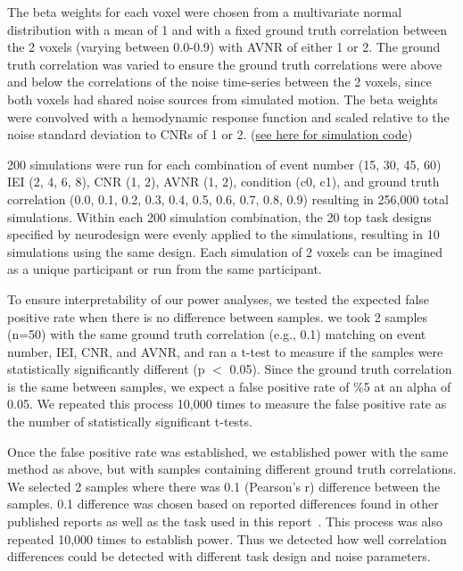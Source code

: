 \documentclass[10pt,letterpaper]{article}
\begin{document}
The beta weights for each voxel were chosen from a multivariate normal distribution
with a mean of 1 and with a fixed ground truth correlation between the 2 voxels 
(varying between 0.0-0.9) with AVNR of either 1 or 2.
The ground truth correlation was varied to ensure the ground truth correlations were above
and below the correlations of the noise time-series between the 2 voxels,
since both voxels had shared noise sources from simulated motion.
The beta weights were convolved with a hemodynamic response function and scaled
relative to the noise standard deviation to CNRs of 1 or 2.
(\href{https://github.com/jdkent/betaSeriesSimulations/tree/38dfbf2d83a8ab742d134c490b850ad893c8b4c7/beta_sim}{see here for simulation code})

200 simulations were run for each combination of event number
(15, 30, 45, 60) IEI (2, 4, 6, 8),  CNR (1, 2), AVNR (1, 2), condition (c0, c1),
and ground truth correlation
(0.0, 0.1, 0.2, 0.3, 0.4, 0.5, 0.6, 0.7, 0.8, 0.9)
resulting in 256,000 total simulations.
Within each 200 simulation combination, the 20 top task designs specified by
neurodesign were evenly applied to the simulations, resulting in 10 simulations
using the same design.
Each simulation of 2 voxels can be imagined as a unique participant or run from
the same participant.

To ensure interpretability of our power analyses, we tested
the expected false positive rate when there is no difference between samples.
we took 2 samples (n=50) with the same ground truth correlation (e.g., 0.1)
matching on event number, IEI, CNR, and AVNR, and ran a t-test to measure if the samples
were statistically significantly different (p $<$ 0.05).
Since the ground truth correlation is the same between samples,
we expect a false positive rate of \%5 at an alpha of 0.05.
We repeated this process 10,000 times to measure the false positive rate as
the number of statistically significant t-tests.

Once the false positive rate was established, we established power with the same method as above,
but with samples containing different ground truth correlations.
We selected 2 samples where there was 0.1 (Pearson's r) difference between the samples.
0.1 difference was chosen based on reported differences found in other published
reports as well as the task used in this report~\cite{Katsura2014,Lee2017,Turner2017,Lin2019,Huang2019}.
This process was also repeated 10,000 times to establish power.
Thus we detected how well correlation differences could be detected
with different task design and noise parameters.
\end{document}
